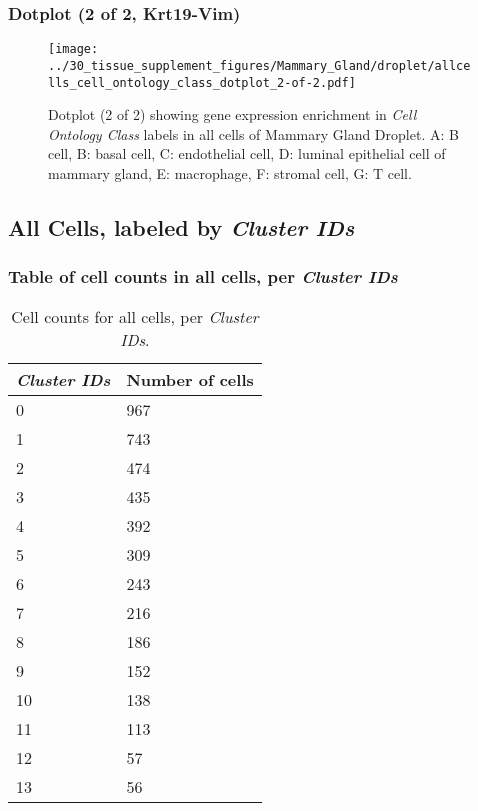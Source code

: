 \clearpage

\subsubsection{Dotplot (2 of 2, Krt19-Vim)}
\begin{figure}[h]
\centering
\texttt{[image: ../30\_tissue\_supplement\_figures/Mammary\_Gland/droplet/allcells\_cell\_ontology\_class\_dotplot\_2-of-2.pdf]}

\caption{ Dotplot (2 of 2)  showing gene expression enrichment in \emph{Cell Ontology Class} labels in all cells of Mammary Gland Droplet. A: B cell, B: basal cell, C: endothelial cell, D: luminal epithelial cell of mammary gland, E: macrophage, F: stromal cell, G: T cell.}
\end{figure}


\clearpage

\subsection{All Cells, labeled by \emph{Cluster IDs}}
\subsubsection{Table of cell counts in all cells, per \emph{Cluster IDs}}\begin{table}[h]
\centering
\label{my-label}
\begin{tabular}{@{}ll@{}}
\toprule

\emph{Cluster IDs}& Number of cells \\ \midrule
0 & 967 \\

1 & 743 \\

2 & 474 \\

3 & 435 \\

4 & 392 \\

5 & 309 \\

6 & 243 \\

7 & 216 \\

8 & 186 \\

9 & 152 \\

10 & 138 \\

11 & 113 \\

12 & 57 \\

13 & 56 \\
\bottomrule
\end{tabular}
\caption{Cell counts for all cells, per \emph{Cluster IDs}.}
\end{table}

